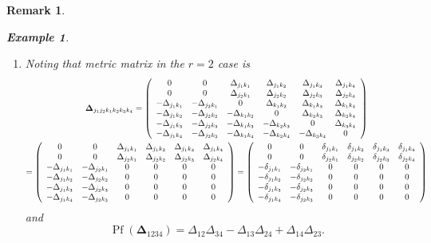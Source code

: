 \documentclass[aps,preprint]{revtex4}%
\newtheorem{example}[theorem]{Example}
\newtheorem{remark}[theorem]{Remark}
\begin{document}
\begin{remark}
\begin{example}
\begin{enumerate}
\item Noting that metric matrix in the $r=2$ case is
\begin{gather}
\mathbf{\Delta}_{j_{1}j_{2}k_{1}k_{2}k_{3}k_{4}}=\left(
\begin{array}
[c]{cccccc}%
0 & 0 & \Delta_{j_{1}k_{1}} & \Delta_{j_{1}k_{2}} & \Delta_{j_{1}k_{3}} &
\Delta_{j_{1}k_{4}}\\
0 & 0 & \Delta_{j_{2}k_{1}} & \Delta_{j_{2}k_{2}} & \Delta_{j_{2}k_{3}} &
\Delta_{j_{2}k_{4}}\\
-\Delta_{j_{1}k_{1}} & -\Delta_{j_{2}k_{1}} & 0 & \Delta_{k_{1}k_{2}} &
\Delta_{k_{1}k_{3}} & \Delta_{k_{1}k_{4}}\\
-\Delta_{j_{1}k_{2}} & -\Delta_{j_{2}k_{2}} & -\Delta_{k_{1}k_{2}} & 0 &
\Delta_{k_{2}k_{3}} & \Delta_{k_{2}k_{4}}\\
-\Delta_{j_{1}k_{3}} & -\Delta_{j_{2}k_{3}} & -\Delta_{k_{1}k_{3}} &
-\Delta_{k_{2}k_{3}} & 0 & \Delta_{k_{3}k_{4}}\\
-\Delta_{j_{1}k_{4}} & -\Delta_{j_{2}k_{3}} & -\Delta_{k_{1}k_{4}} &
-\Delta_{k_{2}k_{4}} & -\Delta_{k_{3}k_{4}} & 0
\end{array}
\right) \\
=\left(
\begin{array}
[c]{cccccc}%
0 & 0 & \Delta_{j_{1}k_{1}} & \Delta_{j_{1}k_{2}} & \Delta_{j_{1}k_{3}} &
\Delta_{j_{1}k_{4}}\\
0 & 0 & \Delta_{j_{2}k_{1}} & \Delta_{j_{2}k_{2}} & \Delta_{j_{2}k_{3}} &
\Delta_{j_{2}k_{4}}\\
-\Delta_{j_{1}k_{1}} & -\Delta_{j_{2}k_{1}} & 0 & 0 & 0 & 0\\
-\Delta_{j_{1}k_{2}} & -\Delta_{j_{2}k_{2}} & 0 & 0 & 0 & 0\\
-\Delta_{j_{1}k_{3}} & -\Delta_{j_{2}k_{3}} & 0 & 0 & 0 & 0\\
-\Delta_{j_{1}k_{4}} & -\Delta_{j_{2}k_{3}} & 0 & 0 & 0 & 0
\end{array}
\right)  =\left(
\begin{array}
[c]{cccccc}%
0 & 0 & \delta_{j_{1}k_{1}} & \delta_{j_{1}k_{2}} & \delta_{j_{1}k_{3}} &
\delta_{j_{1}k_{4}}\\
0 & 0 & \delta_{j_{2}k_{1}} & \delta_{j_{2}k_{2}} & \delta_{j_{2}k_{3}} &
\delta_{j_{2}k_{4}}\\
-\delta_{j_{1}k_{1}} & -\delta_{j_{2}k_{1}} & 0 & 0 & 0 & 0\\
-\delta_{j_{1}k_{2}} & -\delta_{j_{2}k_{2}} & 0 & 0 & 0 & 0\\
-\delta_{j_{1}k_{3}} & -\delta_{j_{2}k_{3}} & 0 & 0 & 0 & 0\\
-\delta_{j_{1}k_{4}} & -\delta_{j_{2}k_{3}} & 0 & 0 & 0 & 0
\end{array}
\right)
\end{gather}
and
\begin{equation}
\operatorname*{Pf}\left(  \mathbf{\Delta}_{1234}\right)  =\Delta_{12}%
\Delta_{34}-\Delta_{13}\Delta_{24}+\Delta_{14}\Delta_{23}.
\end{equation}



\end{enumerate}
\end{example}
\end{remark}
\end{document}

